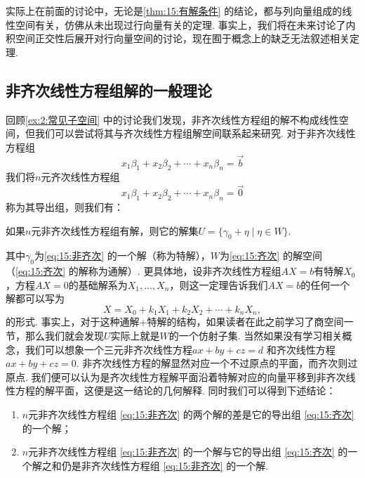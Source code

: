 实际上在前面的讨论中，无论是\autoref{thm:15:有解条件} 的结论，都与列向量组成的线性空间有关，仿佛从未出现过行向量有关的定理. 事实上，我们将在未来讨论了内积空间正交性后展开对行向量空间的讨论，现在囿于概念上的缺乏无法叙述相关定理.

\subsection{非齐次线性方程组解的一般理论}

回顾\autoref{ex:2:常见子空间} 中的讨论我们发现，非齐次线性方程组的解不构成线性空间，但我们可以尝试将其与齐次线性方程组解空间联系起来研究. 对于非齐次线性方程组
\begin{equation} \label{eq:15:非齐次}
    x_1\beta_1+x_2\beta_2+\cdots+x_n\beta_n=\vec{b}
\end{equation}
我们将$n$元齐次线性方程组
\begin{equation} \label{eq:15:齐次}
    x_1\beta_1+x_2\beta_2+\cdots+x_n\beta_n=\vec{0}
\end{equation}
称为其导出组，则我们有：
\begin{theorem}\label{thm:15:通解加特解}
    如果$n$元非齐次线性方程组有解，则它的解集$U=\{\gamma_0+\eta \mid \eta \in W\}$.
\end{theorem}
其中$\gamma_0$为\autoref{eq:15:非齐次} 的一个解（称为特解），$W$为\autoref{eq:15:齐次} 的解空间（\autoref*{eq:15:齐次} 的解称为通解）. 更具体地，设非齐次线性方程组$AX=b$有特解$X_0$，方程$AX=0$的基础解系为$X_1,\ldots,X_n$，则这一定理告诉我们$AX=b$的任何一个解都可以写为
\[X=X_0+k_1X_1+k_2X_2+\cdots+k_nX_n,\]
的形式. 事实上，对于这种通解+特解的结构，如果读者在此之前学习了商空间一节，那么我们就会发现$U$实际上就是$W$的一个仿射子集. 当然如果没有学习相关概念，我们可以想象一个三元非齐次线性方程$ax + by + cz = d$ 和齐次线性方程$ax + by + cz = 0$. 非齐次线性方程的解显然对应一个不过原点的平面，而齐次则过原点. 我们便可以认为是齐次线性方程解平面沿着特解对应的向量平移到非齐次线性方程的解平面，这便是这一结论的几何解释. 同时我们可以得到下述结论：
\begin{enumerate}
    \item $n$元非齐次线性方程组 \ref*{eq:15:非齐次} 的两个解的差是它的导出组 \ref*{eq:15:齐次} 的一个解；

    \item $n$元非齐次线性方程组 \ref*{eq:15:非齐次} 的一个解与它的导出组 \ref*{eq:15:齐次} 的一个解之和仍是非齐次线性方程组 \ref*{eq:15:非齐次} 的一个解.
\end{enumerate}

